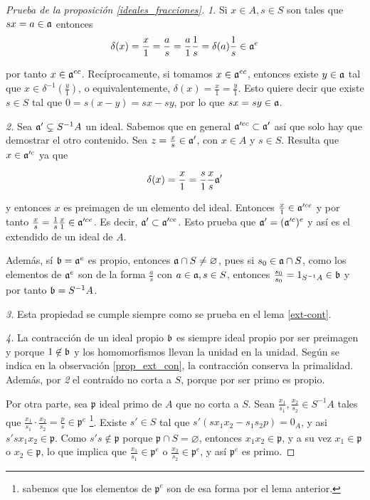 \documentclass[../main.tex]{subfiles}
\begin{document}
\begin{proof}[Prueba de la proposición \ref{ideales_fracciones}]
	\textit{1.} Si $x\in A, s\in S$ son tales que $sx = a \in \mathfrak{a}$ entonces
	\[ \delta(x) = \frac{x}{1} = \frac{a}{s} = \frac{a}{1}\frac{1}{s} = \delta(a) \frac{1}{s} \in \mathfrak{a} ^e \]

	por tanto $x\in \mathfrak{a}^{ec}$. Recíprocamente, si tomamos $x \in \mathfrak{a}^{ec}$, entonces existe $y\in \mathfrak{a}$ tal que $x \in \delta^{-1}(\frac{y}{1})$, o equivalentemente, $\delta(x) = \frac{x}{1} = \frac{y}{1}$. Esto quiere decir que existe $s \in S$ tal que $0 = s(x-y) = sx-sy$, por lo que $sx = sy \in \mathfrak{a}$.

	\textit{2.} Sea $\mathfrak{a} ' \subsetneq S^{-1}A$ un ideal. Sabemos que en general $\mathfrak{a}'^{ec} \subset \mathfrak{a} '$ así que solo hay que demostrar el otro contenido. Sea $z = \frac{x}{s} \in \mathfrak{a}'$, con $x\in A$ y $s\in S$. Resulta que $x\in \mathfrak{a}'^{c}$ ya que

	\[ \delta(x) = \frac{x}{1} = \frac{s}{1} \frac{x}{s} \mathfrak{a}' \]

	y entonces $x$ es preimagen de un elemento del ideal. Entonces $\frac{x}{1} \in \mathfrak{a}'^{ce}$ y por tanto $\frac{x}{s} = \frac{1}{s}\frac{x}{1} \in \mathfrak{a}'^{ce}$. Es decir, $\mathfrak{a}' \subset \mathfrak{a}'^{ce}$. Esto prueba que $\mathfrak{a}' = (\mathfrak{a}'^c)^e$ y así es el extendido de un ideal de $A$.

	Además, sí $\mathfrak{b}= \mathfrak{a}^e$ es propio, entonces $\mathfrak{a} \cap S \neq \varnothing$, pues si $s_0 \in \mathfrak{a} \cap S$, como los elementos de $\mathfrak{a}^e$ son de la forma $\frac{a}{s}$ con $a\in \mathfrak{a}, s\in S$, entonces $\frac{s_0}{s_0} = 1_{S^{-1}A} \in \mathfrak{b}$ y por tanto $\mathfrak{b} = S^{-1}A$.

	\textit{3.} Esta propiedad se cumple siempre como se prueba en el lema \ref{ext-cont}.

	\textit{4.} La contracción de un ideal propio $\mathfrak{b}$ es siempre ideal propio por ser preimagen y porque $1\not \in \mathfrak{b}$ y los homomorfismos llevan la unidad en la unidad. Según se indica en la observación \ref{prop_ext_con}, la contracción conserva la primalidad. Además, por  \textit{2} el contraído no corta a $S$, porque por ser primo es propio.

	Por otra parte, sea $\mathfrak{p}$ ideal primo de $A$ que no corta a $S$. Sean $\frac{x_1}{s_1}, \frac{x_2}{s_2} \in S^{-1}A$ tales que $\frac{x_1}{s_1}\cdot \frac{x_2}{s_2} = \frac{p}{s} \in \mathfrak{p}^e $ \footnote{sabemos que los elementos de $\mathfrak{p}^e$ son de esa forma por el lema anterior.}.
	Existe $s'\in S$ tal que $s'(sx_1x_2 - s_1s_2 p) = 0_A$, y asi $s'sx_1x_2 \in \mathfrak{p}$. Como $s's \not \in \mathfrak{p}$ porque $\mathfrak{p}\cap S = \varnothing$, entonces $x_1x_2 \in \mathfrak{p}$, y a su vez $x_1\in \mathfrak{p}$ o $x_2 \in \mathfrak{p}$, lo que implica que $\frac{x_1}{s_1} \in \mathfrak{p}^e$ o $\frac{x_2}{s_2} \in \mathfrak{p}^e$, y así $\mathfrak{p}^e$ es primo.


\end{proof}
\end{document}
